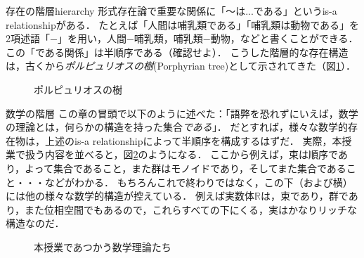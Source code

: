 \documentclass[dvipdfmx,11pt,a4paper]{jsarticle}
\begin{document}
\begin{rei}{存在の階層}{hierarchy}
形式存在論で重要な関係に「〜は...である」というis-a relationshipがある．
たとえば「人間は哺乳類である」「哺乳類は動物である」を2項述語「$-$」を用い，人間$-$哺乳類，哺乳類$-$動物，などと書くことができる．
この「である関係」は半順序である（確認せよ）．
こうした階層的な存在構造は，古くから\emph{ポルピュリオスの樹}(Porphyrian tree)として示されてきた（図\ref{fig:porphyrian}）．
\end{rei}
\begin{figure}[h]
\centering
{}
\caption{ポルピュリオスの樹}
\label{fig:porphyrian} 
\end{figure}

\begin{rei}{数学の階層}{}
この章の冒頭で以下のように述べた：「語弊を恐れずにいえば，数学の理論とは，何らかの構造を持った集合\emph{である}」．
だとすれば，様々な数学的存在物は，上述のis-a relationshipによって半順序を構成するはずだ．
実際，本授業で扱う内容を並べると，図\ref{fig:math_hierarchy}のようになる．
ここから例えば，束は順序であり，よって集合であること，また群はモノイドであり，そしてまた集合であること・・・などがわかる．
もちろんこれで終わりではなく，この下（および横）には他の様々な数学的構造が控えている．
例えば実数体$\mathbb{R}$は，束であり，群であり，また位相空間でもあるので，これらすべての下にくる，実はかなりリッチな構造なのだ．
\end{rei}
\begin{figure}[h]
\centering
{}
\caption{本授業であつかう数学理論たち}
\label{fig:math_hierarchy} 
\end{figure}
\end{document}
